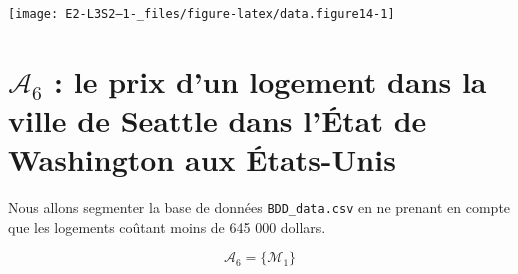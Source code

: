 \documentclass[
  11pt,
  french,
]{article}
\newenvironment{Shaded}{\begin{snugshade}}{\end{snugshade}}
\newcommand{\DecValTok}[1]{\textcolor[rgb]{0.00,0.00,0.81}{#1}}
\newcommand{\NormalTok}[1]{#1}
\newcommand{\OperatorTok}[1]{\textcolor[rgb]{0.81,0.36,0.00}{\textbf{#1}}}
\newcommand{\StringTok}[1]{\textcolor[rgb]{0.31,0.60,0.02}{#1}}
\begin{document}
\begin{center}\texttt{[image: E2-L3S2--1-\_files/figure-latex/data.figure14-1]} \end{center}

\newpage

\hypertarget{mathcala_6-le-prix-dun-logement-dans-la-ville-de-seattle-dans-luxe9tat-de-washington-aux-uxe9tats-unis}{%
\section{\texorpdfstring{\(\mathcal{A}_{6}\) : le prix d'un logement
dans la ville de Seattle dans l'État de Washington aux
États-Unis}{\textbackslash mathcal\{A\}\_\{6\} : le prix d'un logement dans la ville de Seattle dans l'État de Washington aux États-Unis}}\label{mathcala_6-le-prix-dun-logement-dans-la-ville-de-seattle-dans-luxe9tat-de-washington-aux-uxe9tats-unis}}

Nous allons segmenter la base de données \texttt{BDD\_data.csv} en ne
prenant en compte que les logements coûtant moins de 645 000 dollars.

\begin{Shaded}
\end{Shaded}

\[\mathcal{A}_{6}=\{\mathcal{M}_{1}\}\]
\end{document}
